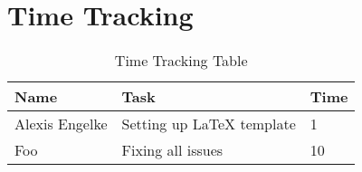 \chapter{Time Tracking}\label{chapter:times}

\begin{table}[htpb]
  \caption[Time Tracking Table]{Time Tracking Table}\label{tab:times}
  \centering
  \begin{tabular}{l l l}
    \toprule
      Name & Task & Time \\
    \midrule
      Alexis Engelke & Setting up LaTeX template & 1 \\
      Foo & Fixing all issues & 10 \\
    \bottomrule
  \end{tabular}
\end{table}
